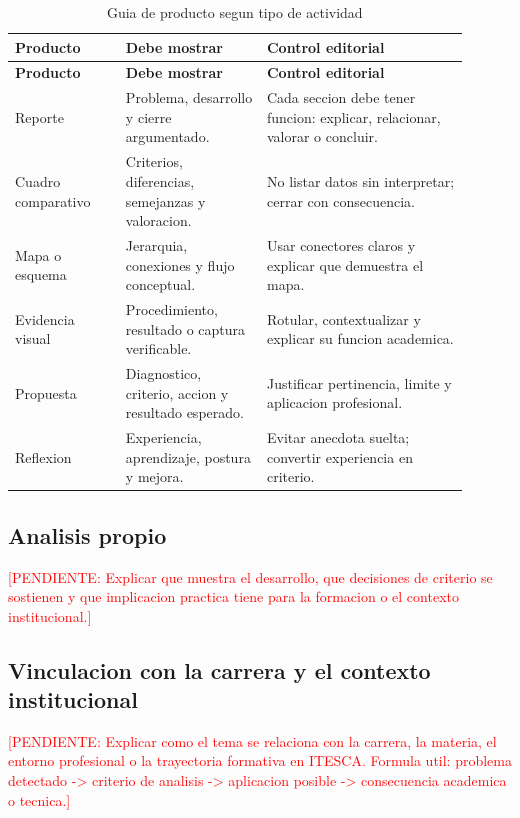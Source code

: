 \documentclass[
	spanish,
	letterpaper, oneside
]{article}
\newcommand{\pendiente}[1]{\textcolor{red}{[PENDIENTE: #1]}}
\begin{document}
\begin{longtable}{@{}p{0.22\linewidth}p{0.28\linewidth}p{0.40\linewidth}@{}}
	\caption{Guia de producto segun tipo de actividad}\label{tab:producto-academico-itesca}\\
	\toprule
	\textbf{Producto} & \textbf{Debe mostrar} & \textbf{Control editorial} \\
	\midrule
	\endfirsthead
	\toprule
	\textbf{Producto} & \textbf{Debe mostrar} & \textbf{Control editorial} \\
	\midrule
	\endhead
	Reporte & Problema, desarrollo y cierre argumentado. & Cada seccion debe tener funcion: explicar, relacionar, valorar o concluir. \\
	Cuadro comparativo & Criterios, diferencias, semejanzas y valoracion. & No listar datos sin interpretar; cerrar con consecuencia. \\
	Mapa o esquema & Jerarquia, conexiones y flujo conceptual. & Usar conectores claros y explicar que demuestra el mapa. \\
	Evidencia visual & Procedimiento, resultado o captura verificable. & Rotular, contextualizar y explicar su funcion academica. \\
	Propuesta & Diagnostico, criterio, accion y resultado esperado. & Justificar pertinencia, limite y aplicacion profesional. \\
	Reflexion & Experiencia, aprendizaje, postura y mejora. & Evitar anecdota suelta; convertir experiencia en criterio. \\
	\bottomrule
\end{longtable}

\subsection{Analisis propio}

\pendiente{Explicar que muestra el desarrollo, que decisiones de criterio se sostienen y que implicacion practica tiene para la formacion o el contexto institucional.}

\subsection{Vinculacion con la carrera y el contexto institucional}

\pendiente{Explicar como el tema se relaciona con la carrera, la materia, el entorno profesional o la trayectoria formativa en ITESCA. Formula util: problema detectado -> criterio de analisis -> aplicacion posible -> consecuencia academica o tecnica.}
\end{document}
